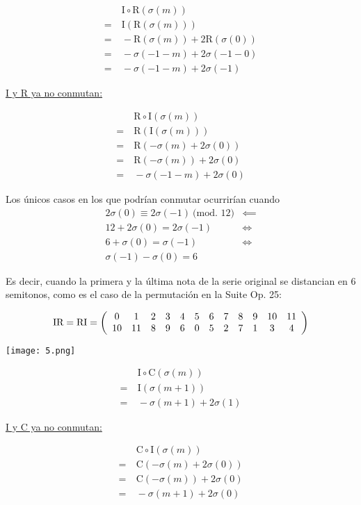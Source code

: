 		\begin{multicols}{3}
			\begin{align*}
		&\ \mbox{I}\circ\mbox{R}(\sigma(m))\\
		=&\ \mbox{I}(\mbox{R}(\sigma(m)))\\
		=&\ -\mbox{R}(\sigma(m))+2\mbox{R}(\sigma(0))\\
		=&\ -\sigma(-1-m)+2\sigma(-1-0)\\
		=&\ -\sigma(-1-m)+2\sigma(-1)
		\end{align*}
		
		\underline{I y R ya no conmutan:}
		
		\begin{align*}
		&\ \mbox{R}\circ\mbox{I}(\sigma(m))\\
		=&\ \mbox{R}(\mbox{I}(\sigma(m)))\\
		=&\ \mbox{R}(-\sigma(m)+2\sigma(0))\\
		=&\ \mbox{R}(-\sigma(m))+2\sigma(0)\\
		=&\ -\sigma(-1-m)+2\sigma(0)
		\end{align*}
		\end{multicols}
		
		Los \'unicos casos en los que podr\'ian conmutar ocurrir\'ian cuando
		\begin{align*}
		2\sigma(0)\equiv2\sigma(-1)\ \mbox{(mod. 12)}&\impliedby\\
		12+2\sigma(0)=2\sigma(-1)&\Longleftrightarrow\\
		6+\sigma(0)=\sigma(-1)&\Longleftrightarrow\\
		\sigma(-1)-\sigma(0)=6&
		\end{align*}
		
		Es decir, cuando la primera y la \'ultima nota de la serie original se distancian en 6 semitonos, como es el caso de la permutaci\'on en la Suite Op. 25:
		
		\[
		\mbox{IR}=\mbox{RI}=\drow{10,11,8,9,6,0,5,2,7,1,3,4}
		\]	
		
		\begin{center}
		\texttt{[image: 5.png]}
		\end{center}
		
		\begin{multicols}{3}
			\begin{align*}
			&\ \mbox{I}\circ\mbox{C}(\sigma(m))\\
			=&\ \mbox{I}(\sigma(m+1))\\
			=&\ -\sigma(m+1)+2\sigma(1)
			\end{align*}
			
			\underline{I y C ya no conmutan:}
			
			\begin{align*}
			&\ \mbox{C}\circ\mbox{I}(\sigma(m))\\
			=&\ \mbox{C}(-\sigma(m)+2\sigma(0))\\
			=&\ \mbox{C}(-\sigma(m))+2\sigma(0)\\
			=&\ -\sigma(m+1)+2\sigma(0)
			\end{align*}
		\end{multicols}
		
